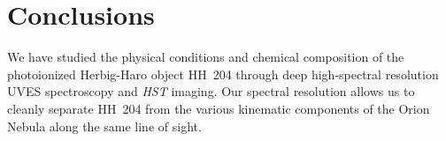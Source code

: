 \documentclass[twocolumn]{aastex63}
\begin{document}













\section{Conclusions}
\label{sec:conc}

We have studied the physical conditions and chemical composition of the photoionized Herbig-Haro object HH~204 through deep high-spectral resolution UVES spectroscopy and \textit{HST} imaging.  
Our spectral resolution allows us to cleanly separate HH~204 from the various kinematic components of the Orion Nebula along the same line of sight.
\end{document}
